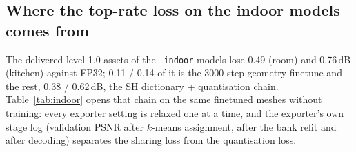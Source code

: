 \documentclass[11pt,a4paper]{article}
\begin{document}
\subsection{Where the top-rate loss on the indoor models comes from}
\label{sec:indoor}

The delivered level-1.0 assets of the \texttt{--indoor} models lose 0.49 (room) and 0.76\,dB (kitchen) against FP32; 0.11 / 0.14 of it is the 3000-step geometry finetune and the rest, 0.38 / 0.62\,dB, the SH dictionary + quantisation chain. Table~\ref{tab:indoor} opens that chain on the same finetuned meshes without training: every exporter setting is relaxed one at a time, and the exporter's own stage log (validation PSNR after $k$-means assignment, after the bank refit and after decoding) separates the sharing loss from the quantisation loss.
\end{document}
